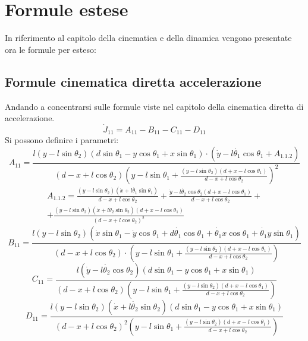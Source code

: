 \section{Formule estese}\label{Appendice:formule}
In riferimento al capitolo della cinematica e della dinamica vengono presentate ora le formule per esteso:
\subsection{Formule cinematica diretta accelerazione}\label{Appendice:formuleCinematica}
Andando a concentrarsi sulle formule viste nel capitolo della cinematica diretta di accelerazione.
\begin{equation}
\dot{J}_{11} = A_{11} - B_{11} - C_{11} - D_{11}
\end{equation}
Si possono definire i parametri: 
\begin{equation*}
A_{11} = \frac{l(y-l\sin\theta_{2})(d\sin\theta_{1}-y\cos\theta _{1}+x\sin\theta _{1})\cdot (\dot{y}-l\dot{\theta_1}\cos\theta _{1}+A_{1.1.2})}{(d-x+l\cos\theta_{2})(y-l\sin\theta_{1}+\frac{(y-l\sin\theta _{2})(d+x-l\cos\theta _{1})}{d-x+l\cos\theta _{2}})^2}
\end{equation*}
\begin{equation*}
\begin{split}
A_{1.1.2} = \frac{(y-l\sin\theta_{2})(\dot{x}+l\dot{\theta_1}\sin\theta_{1})}{d-x+l\cos\theta_{2}}+\frac{\dot{y}-l\dot{\theta_2}\cos\theta_{2}(d+x-l\cos\theta_{1})}{d-x+l\cos\theta_{2}}+  \\
+ \frac{(y-l\sin\theta_{2})(\dot{x}+l\dot{\theta}_{2}\sin\theta_{2})(d+x-l\cos\theta_{1})}{{(d-x+l\cos\theta_{2})}^2}
\end{split}
\end{equation*}
\begin{equation*}
B_{11} =\frac{l(y-l\sin\theta_{2})(\dot{x}\sin\theta_{1}-\dot{y}\cos\theta_{1}+d\dot{\theta_1}\cos\theta_{1}+\dot{\theta_1}x\cos\theta_{1}+\dot{\theta_{1}}y\sin\theta _{1})}{(d-x+l\cos\theta_{2})\cdot(y-l\sin\theta_{1}+\frac{(y-l\sin\theta_{2})(d+x-l\cos\theta_{1})}{d-x+l\cos\theta_{2}})}
\end{equation*}
\begin{equation*}
C_{11} = \frac{l(\dot{y}-l\dot{\theta_{2}}\cos\theta_{2})(d\sin\theta_{1}
    -y\cos\theta_{1}+x\sin\theta_{1})}{(d-x+l\cos\theta_{2})(y-l\sin\theta_{1}+\frac{(y-l\sin\theta_{2})
    (d+x-l\cos\theta_{1})}{d-x+l\cos\theta_{2}})}
\end{equation*}
\begin{equation*}
D_{11} = \frac{l(y-l\sin\theta_{2})(\dot{x}+l\dot{\theta_2}\sin\theta_{2})
    (d\sin\theta_{1}-y\cos\theta_{1}+x\sin\theta_{1})}{(d-x+l\cos\theta_{2})^2(y-l\sin\theta_{1}+\frac{(y-l\sin\theta_{2})
    (d+x-l\cos\theta_{1})}{d-x+l\cos\theta _{2}})}
\end{equation*}
